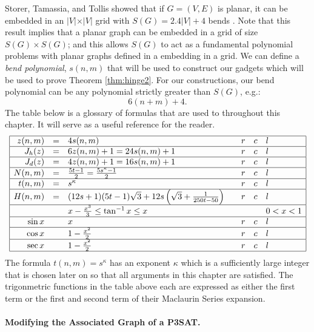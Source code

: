 \documentclass[10pt]{CSUNthesis}
\theoremstyle{plain}%
\theoremstyle{definition}
\theoremstyle{remark}
\newcommand{\lr}[1]{\left( #1 \right)}
\begin{document}
Storer, Tamassia, and Tollis showed that if $G=(V,E)$ is planar, it can be embedded in an $\vert V \vert \times \vert V \vert$ grid with $S(G)=2.4\vert V\vert + 4$ bends \cite{storer1984minimal,tamassia1987efficient}.
Note that this result implies that a planar graph can be embedded in a grid of size $S(G) \times S(G)$; and this allows $S(G)$ to act as a fundamental polynomial problems with planar graphs defined in a embedding in a grid.
We can define a \textit{bend polynomial}, $s(n,m)$ that will be used to construct our gadgets which will be used to prove Theorem \ref{thm:hinge2}.
For our constructions, our bend polynomial can be any polynomial strictly greater than $S(G)$, e.g.:
$$6 (n+m) + 4.$$
The table below is a glossary of formulas that are used to throughout this chapter.
It will serve as a useful reference for the reader.
$$
\begin{array}{|rclcrcl|}
\hline
z(n,m)		&=& 4 s(n,m)																  		&&r&c&l\\\hline
J_h (z) 	&=& 6z(n,m)+1												= 24s(n,m)+1  			&&r&c&l\\\hline
J_d (z) 	&=& 4z(n,m)+1												= 16s(n,m)+1  			&&r&c&l\\\hline
N(n,m)		&=& \frac{5t-1}{2}											= \frac{5s^\kappa-1}{2}	&&r&c&l\\\hline
t(n,m)		&=& s^\kappa																		&&r&c&l\\\hline
H(n,m) 		&=&  (12s+1)  (5t-1)  \sqrt{3} + 12s \lr{\sqrt{3}+ \frac{1}{250t-50}}				&&r&c&l\\\hline
			&& 	x - \frac{x^3}{3}\leq\tan^{-1}x\leq x											&&&&0< x < 1 \\\hline
\sin x 		&& x 																				&&r&c&l\\\hline
\cos x 		&& 1-\frac{x^2}{2}																	&&r&c&l\\\hline
\sec x 		&& 1-\frac{x^2}{2}																	&&r&c&l\\\hline
\end{array}
$$
The formula $t(n,m)=s^\kappa$ has an exponent $\kappa$ which is a sufficiently large integer that is chosen later on so that all arguments in this chapter are satisfied.
The trigonmetric functions in the table above each are expressed as either the first term or the first and second term of their Maclaurin Series expansion.

\paragraph{Modifying the Associated Graph of a P3SAT.}
\end{document}
